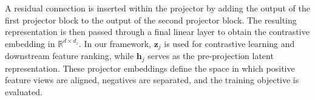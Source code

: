 \documentclass[sigconf,natbib=true,anonymous=true]{acmart}
\begin{document}
A residual connection is inserted within the projector by adding the output of
the first projector block to the output of the second projector block. The
resulting representation is then passed through a final linear layer to obtain
the contrastive embedding in $\mathbb{R}^{d \times d_z}$. In our framework,
$\mathbf{z}_j$ is used for contrastive learning and downstream feature ranking,
while $\mathbf{h}_j$ serves as the pre-projection latent representation. These
projector embeddings define the space in which positive feature views are
aligned, negatives are separated, and the training objective is evaluated.



\begin{table}[t]
\centering
\caption{Architecture of the feature-wise encoder and projector. The encoder block consists of a linear transformation followed by batch normalization, LeakyReLU, and dropout, while each projector block consists of a linear transformation followed by batch normalization and ReLU activation.}
\label{tab:arch}
\small
\setlength{\tabcolsep}{5pt}
\renewcommand{\arraystretch}{1.1}
\end{table}
\end{document}
